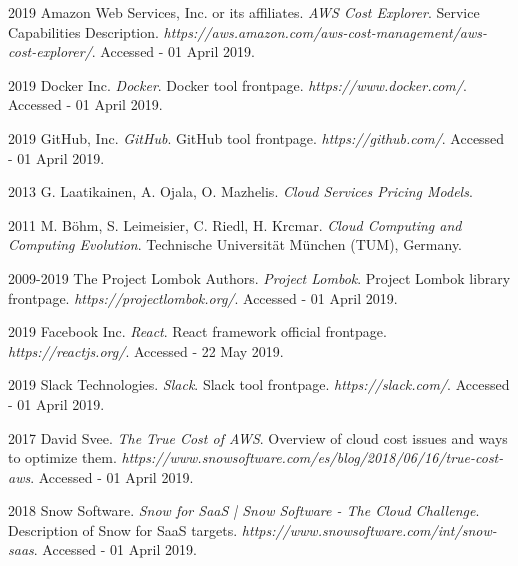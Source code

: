 \documentclass[licencjacka,en]{thesisclass}
\begin{document}
\begin{thebibliography}{99}
        2019 Amazon Web Services, Inc. or its affiliates.
        \textit{AWS Cost Explorer}.
        Service Capabilities Description.
        \textit{https://aws.amazon.com/aws-cost-management/aws-cost-explorer/}.
        Accessed - 01 April 2019.

        2019 Docker Inc.
        \textit{Docker}.
        Docker tool frontpage.
        \textit{https://www.docker.com/}.
        Accessed - 01 April 2019.

        2019 GitHub, Inc.
        \textit{GitHub}.
        GitHub tool frontpage.
        \textit{https://github.com/}.
        Accessed - 01 April 2019.

        2013 G. Laatikainen, A. Ojala, O. Mazhelis.
        \textit{Cloud Services Pricing Models}.

        2011 M. Böhm, S. Leimeisier, C. Riedl, H. Krcmar.
        \textit{Cloud Computing and Computing Evolution}.
        Technische Universität München (TUM), Germany.

        2009-2019 The Project Lombok Authors.
        \textit{Project Lombok}.
        Project Lombok library frontpage.
        \textit{https://projectlombok.org/}.
        Accessed - 01 April 2019.

        2019 Facebook Inc.
        \textit{React}.
        React framework official frontpage.
        \textit{https://reactjs.org/}.
        Accessed - 22 May 2019.
        
        2019 Slack Technologies.
        \textit{Slack}.
        Slack tool frontpage.
        \textit{https://slack.com/}.
        Accessed - 01 April 2019.

        2017 David Svee.
        \textit{The True Cost of AWS}.
        Overview of cloud cost issues and ways to optimize them.
        \textit{https://www.snowsoftware.com/es/blog/2018/06/16/true-cost-aws}.
        Accessed - 01 April 2019.

        2018 Snow Software.
        \textit{Snow for SaaS | Snow Software - The Cloud Challenge}.
        Description of Snow for SaaS targets.
        \textit{https://www.snowsoftware.com/int/snow-saas}.
        Accessed - 01 April 2019.


\end{thebibliography}
\end{document}
